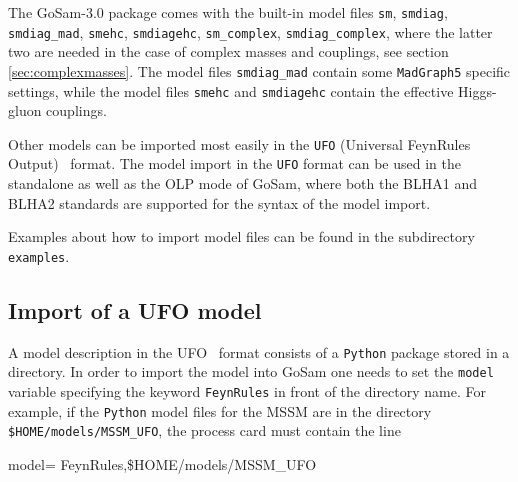 \documentclass[11pt,a4paper]{refrep}
\newcommand{\gosamversion}{{3{.}0}}
\newcommand{\gosam}{{\sc GoSam}\xspace}
\begin{document}
The \gosam{}-\gosamversion{} package comes with the built-in model files 
{\tt sm}, {\tt smdiag}, {\tt smdiag\_mad}, {\tt smehc}, {\tt smdiagehc},
{\tt sm\_complex}, {\tt smdiag\_complex}, 
where the latter two are needed in the case of complex masses and couplings, 
see section \ref{sec:complexmasses}. 
The model files {\tt smdiag\_mad} contain some {\tt MadGraph5} specific settings, while
the model files {\tt smehc} and {\tt smdiagehc} contain the effective Higgs-gluon couplings.

Other models can be imported most easily in the {\tt UFO} (Universal FeynRules Output)~\cite{Degrande:2011ua,Darme:2023jdn} format.
The model import in the {\tt UFO} format can be used in the standalone as well as the OLP 
mode of \gosam, where both the BLHA1 and BLHA2 standards are supported for the syntax of the model import.

Examples about how to import model files can be found in the subdirectory 
 \texttt{examples}.

\subsection{Import of a UFO model}
A model description in the UFO~\cite{Degrande:2011ua,Darme:2023jdn} format consists of a \texttt{Python} package
stored in a directory. In order to import the model into \gosam{} one needs
to set the \texttt{model} variable specifying the keyword \texttt{FeynRules}
in front of the directory name.
For example, if the \texttt{Python} model files for the MSSM are in 
 the directory \\
 \texttt{\$HOME/models/MSSM\_UFO}, the process card must contain the line
\begin{example}
model= FeynRules,\$HOME/models/MSSM\_UFO
\end{example}
\end{document}

